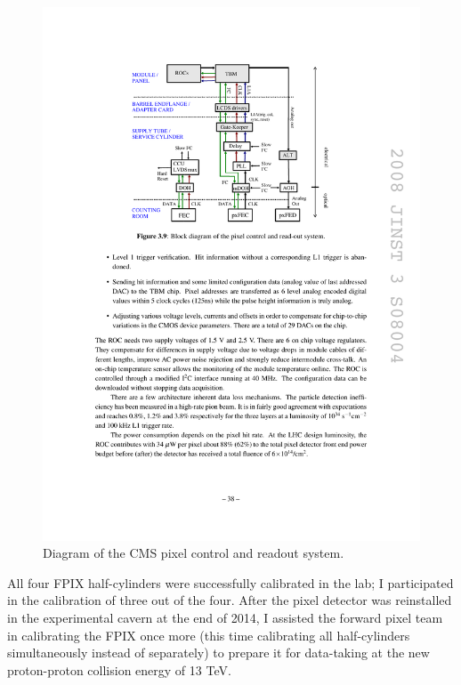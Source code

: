 \begin{figure}[hbtp]
  \begin{center}
    \includegraphics[width=2.0\cmsFigWidth]{figures/cms-pixel-readout}
    \caption{Diagram of the CMS pixel control and readout system. ~\cite{1748-0221-3-08-S08004}}
    \label{fig:cms-pixel-readout}
  \end{center}
\end{figure}

All four FPIX half-cylinders were successfully calibrated in the lab; I participated in the calibration of three out of the four. After the pixel detector was reinstalled in the experimental cavern at the end of 2014, I assisted the forward pixel team in calibrating the FPIX once more (this time calibrating all half-cylinders simultaneously instead of separately) to prepare it for data-taking at the new proton-proton collision energy of 13 TeV.